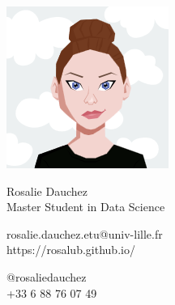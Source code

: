 \documentclass{article}
\begin{document}
\centering \includegraphics[width=.25\linewidth]{AvatarMaker}\\[5pt]
\parbox{2in}{\Large \centering Rosalie Dauchez\\[1pt]
\normalsize Master Student in Data Science}

\vfill
\raggedright
\begin{multicols}{2}
rosalie.dauchez.etu@univ-lille.fr\\
https://rosalub.github.io/

\columnbreak
\raggedleft
@rosaliedauchez\\
+33 6 88 76 07 49%
\end{multicols}%
\end{document}
